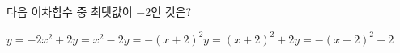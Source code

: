 다음 이차함수 중 최댓값이 $-2$인 것은?
\begin{choices32}{$y=-2x^2+2$}{$y=x^2-2$}{$y=-(x+2)^2$}{$y=(x+2)^2+2$}{$y=-(x-2)^2-2$}\end{choices32}
